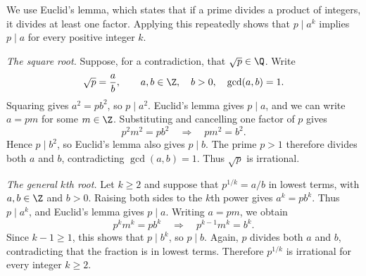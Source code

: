 We use Euclid's lemma, which states that if a prime divides a
product of integers, it divides at least one factor. Applying this
repeatedly shows that $p\mid a^k$ implies $p\mid a$ for every
positive integer $k$.

\textit{The square root.}
Suppose, for a contradiction, that $\sqrt p\in\Q$. Write
\[
  \sqrt p=\frac ab,
  \qquad a,b\in\Z,\quad b>0,\quad\gcd(a,b)=1.
\]
Squaring gives $a^2=pb^2$, so $p\mid a^2$.
Euclid's lemma gives $p\mid a$, and we can write $a=pm$
for some $m\in\Z$. Substituting and cancelling one factor of $p$ gives
\[
  p^2m^2=pb^2
  \quad\Longrightarrow\quad
  pm^2=b^2.
\]
Hence $p\mid b^2$, so Euclid's lemma also gives $p\mid b$.
The prime $p>1$ therefore divides both $a$ and $b$,
contradicting $\gcd(a,b)=1$. Thus $\sqrt p$ is irrational.

\textit{The general $k$th root.}
Let $k\ge2$ and suppose that $p^{1/k}=a/b$ in lowest terms,
with $a,b\in\Z$ and $b>0$. Raising both sides to the $k$th
power gives $a^k=pb^k$. Thus $p\mid a^k$, and Euclid's lemma
gives $p\mid a$. Writing $a=pm$, we obtain
\[
  p^km^k=pb^k
  \quad\Longrightarrow\quad
  p^{k-1}m^k=b^k.
\]
Since $k-1\ge1$, this shows that $p\mid b^k$, so $p\mid b$.
Again, $p$ divides both $a$ and $b$, contradicting that the
fraction is in lowest terms. Therefore $p^{1/k}$ is irrational
for every integer $k\ge2$.
